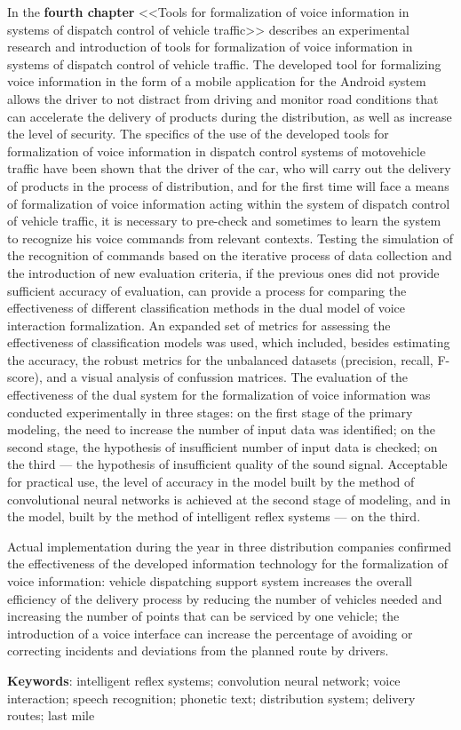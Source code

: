 In the \textbf{fourth chapter} <<Tools for formalization of voice information in systems of dispatch control of vehicle traffic>> describes an experimental research and introduction of tools for formalization of voice information in systems of dispatch control of vehicle traffic.
The developed tool for formalizing voice information in the form of a mobile application for the Android system allows the driver to not distract from driving and monitor road conditions that can accelerate the delivery of products during the distribution, as well as increase the level of security.
The specifics of the use of the developed tools for formalization of voice information in dispatch control systems of motovehicle traffic have been shown that the driver of the car, who will carry out the delivery of products in the process of distribution, and for the first time will face a means of formalization of voice information acting within the system of dispatch control of vehicle traffic, it is necessary to pre-check and sometimes to learn the system to recognize his voice commands from relevant contexts.
Testing the simulation of the recognition of commands based on the iterative process of data collection and the introduction of new evaluation criteria, if the previous ones did not provide sufficient accuracy of evaluation, can provide a process for comparing the effectiveness of different classification methods in the dual model of voice interaction formalization.
An expanded set of metrics for assessing the effectiveness of classification models was used, which included, besides estimating the accuracy, the robust metrics for the unbalanced datasets (precision, recall, F-score), and a visual analysis of confussion matrices.
The evaluation of the effectiveness of the dual system for the formalization of voice information was conducted experimentally in three stages: on the first stage of the primary modeling, the need to increase the number of input data was identified; on the second stage, the hypothesis of insufficient number of input data is checked; on the third --- the hypothesis of insufficient quality of the sound signal. Acceptable for practical use, the level of accuracy in the model built by the method of convolutional neural networks is achieved at the second stage of modeling, and in the model, built by the method of intelligent reflex systems --- on the third.

Actual implementation during the year in three distribution companies confirmed the effectiveness of the developed information technology for the formalization of voice information: vehicle dispatching support system increases the overall efficiency of the delivery process by reducing the number of vehicles needed and increasing the number of points that can be serviced by one vehicle; the introduction of a voice interface can increase the percentage of avoiding or correcting incidents and deviations from the planned route by drivers.

\textbf{Keywords}: intelligent reflex systems; convolution neural network; voice interaction; speech recognition; phonetic text; distribution system; delivery routes; last mile
